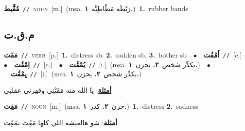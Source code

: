 \documentclass[10pt,a4paper,twoside]{article} %
\begin{document}
\begin{multicols}{2}
{\setlength\topsep{0pt}\textbf{\foreignlanguage{arabic}{مُغَّيط}}\ {\color{gray}\texttt{//}\color{black}}\ \textsc{noun}\ [m.]\ \color{gray}(msa. \foreignlanguage{arabic}{رَبْطَة مَطّاطِيَّة}~\foreignlanguage{arabic}{\textbf{١.}})\color{black}\ \textbf{1.}~rubber bands\ } \vspace{2mm}

\vspace{-3mm}
\subsection*{\color{blue}\foreignlanguage{arabic}{م.ق.ت}\color{blue}{}} 

{\setlength\topsep{0pt}\textbf{\foreignlanguage{arabic}{مَقَت}}\ {\color{gray}\texttt{//}\color{black}}\ \textsc{verb}\ [p.]\ \textbf{1.}~distress sb.  \textbf{2.}~sadden sb.  \textbf{3.}~bother sb\ \ $\bullet$\ \ \setlength\topsep{0pt}\textbf{\foreignlanguage{arabic}{اُمْقُت}}\ {\color{gray}\texttt{//}\color{black}}\ [c.]\ \ $\bullet$\ \ \setlength\topsep{0pt}\textbf{\foreignlanguage{arabic}{اِمْقُت}}\ {\color{gray}\texttt{//}\color{black}}\ [c.]\ \ $\bullet$\ \ \setlength\topsep{0pt}\textbf{\foreignlanguage{arabic}{يُمْقُت}}\ {\color{gray}\texttt{//}\color{black}}\ [i.]\ \color{gray}(msa. \foreignlanguage{arabic}{يكدِّر شخص}~\foreignlanguage{arabic}{\textbf{٢.}}  \foreignlanguage{arabic}{يحزن}~\foreignlanguage{arabic}{\textbf{١.}})\color{black}\ \ $\bullet$\ \ \setlength\topsep{0pt}\textbf{\foreignlanguage{arabic}{يِمْقُت}}\ {\color{gray}\texttt{//}\color{black}}\ [i.]\ \color{gray}(msa. \foreignlanguage{arabic}{يكدِّر شخص}~\foreignlanguage{arabic}{\textbf{٢.}}  \foreignlanguage{arabic}{يحزن}~\foreignlanguage{arabic}{\textbf{١.}})\color{black}\  \begin{flushright}\color{gray}\foreignlanguage{arabic}{\textbf{\underline{\foreignlanguage{arabic}{أمثلة}}}: يا الله منه مَقَتْنِي وقهرني عقلبي}\end{flushright}\color{black}} \vspace{2mm}

{\setlength\topsep{0pt}\textbf{\foreignlanguage{arabic}{مَقِت}}\ {\color{gray}\texttt{//}\color{black}}\ \textsc{noun}\ [m.]\ \color{gray}(msa. \foreignlanguage{arabic}{حزن}~\foreignlanguage{arabic}{\textbf{٢.}}  \foreignlanguage{arabic}{كدر}~\foreignlanguage{arabic}{\textbf{١.}})\color{black}\ \textbf{1.}~distress  \textbf{2.}~sadness\  \begin{flushright}\color{gray}\foreignlanguage{arabic}{\textbf{\underline{\foreignlanguage{arabic}{أمثلة}}}: شو هالعيشة اللي كلها مَقَِت بمَقَِت}\end{flushright}\color{black}} \vspace{2mm}


\end{multicols}
\end{document}
